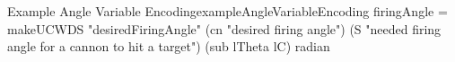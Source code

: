 \begin{pseudohaskell}{Example Angle Variable Encoding}{exampleAngleVariableEncoding}
firingAngle = makeUCWDS "desiredFiringAngle"
    (cn "desired firing angle")
    (S "needed firing angle for a cannon to hit a target")
    (sub lTheta lC)
    radian
\end{pseudohaskell}

